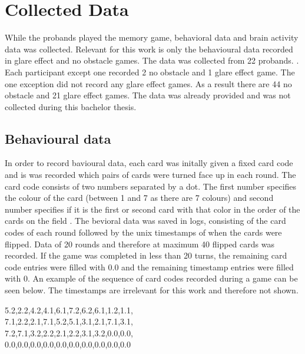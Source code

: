 \chapter{Collected Data}
\label{collected_data}
While the probands played the memory game, behavioral data and brain activity data was collected. Relevant for this work is only the behavioural data recorded in glare effect and no obstacle games. The data was collected from 22 probands. . Each participant except one recorded 2 no obstacle and 1 glare effect game. The one exception did not record any glare effect games. As a result there are 44 no obstacle and 21 glare effect games. The data was already provided and was not collected during this bachelor thesis.

\section{Behavioural data}
\label{behavioural_data}
In order to record bavioural data, each card was initally given a fixed card code and is was recorded which pairs of cards were turned face up in each round. The card code consists of two numbers separated by a dot. The first number specifies the colour of the card (between 1 and 7 as there are 7 colours) and second number specifies if it is the first or second card with that color in the order of the cards on the field . The bevioral data was saved in logs, consisting of the card codes of each round followed by the unix timestamps of when the cards were flipped. Data of 20 rounds and therefore at maximum 40 flipped cards was recorded. If the game was completed in less than 20 turns, the remaining card code entries were filled with 0.0 and the remaining timestamp entries were filled with 0. An example of the sequence of card codes recorded during a game can be seen below. The timestamps are irrelevant for this work and therefore not shown. 
\begin{center}
	5.2,2.2,4.2,4.1,6.1,7.2,6.2,6.1,1.2,1.1,\\
	7.1,2.2,2.1,7.1,5.2,5.1,3.1,2.1,7.1,3.1,\\
	7.2,7.1,3.2,2.2,2.1,2.2,3.1,3.2,0.0,0.0,\\
	0.0,0.0,0.0,0.0,0.0,0.0,0.0,0.0,0.0,0.0
\end{center}

